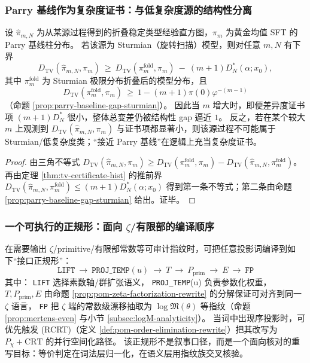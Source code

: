 \subsubsection{Parry 基线作为复杂度证书：与低复杂度源的结构性分离}
\begin{corollary}[折叠直方图 \texorpdfstring{$\Rightarrow$}{=>} 复杂度证书]\label{cor:pom-parry-complexity-detector}
设 \(\hat{\pi}_{m,N}\) 为从某源过程得到的折叠稳定类型经验直方图，\(\pi_m\) 为黄金均值 SFT 的 Parry 基线柱分布。
若该源为 Sturmian（旋转扫描）模型，则对任意 \(m,N\) 有下界
$$
D_{\mathrm{TV}}(\hat{\pi}_{m,N},\pi_m)
\ \ge\
D_{\mathrm{TV}}(\pi_m^{\mathrm{fold}},\pi_m)\ -\ (m+1)D_N^*(\alpha;x_0),
$$
其中 \(\pi_m^{\mathrm{fold}}\) 为 Sturmian 极限分布折叠后的模型分布，且
$$
D_{\mathrm{TV}}(\pi_m^{\mathrm{fold}},\pi_m)\ \ge\ 1-(m+1)\pi(0)\varphi^{-(m-1)}
$$
（命题 \ref{prop:parry-baseline-gap-sturmian}）。
因此当 \(m\) 增大时，即便差异度证书项 \((m+1)D_N^*\) 很小，整体总变差仍被结构性 gap 逼近 \(1\)。
反之，若在某个较大 \(m\) 上观测到 \(D_{\mathrm{TV}}(\hat{\pi}_{m,N},\pi_m)\) 与证书项都显著小，则该源过程不可能属于 Sturmian/低复杂度类；“接近 Parry 基线”在逻辑上充当复杂度证书。
\end{corollary}
\begin{proof}
由三角不等式
\(
D_{\mathrm{TV}}(\hat{\pi}_{m,N},\pi_m)\ge D_{\mathrm{TV}}(\pi_m^{\mathrm{fold}},\pi_m)-D_{\mathrm{TV}}(\hat{\pi}_{m,N},\pi_m^{\mathrm{fold}})
\)。
再由定理 \ref{thm:tv-certificate-hist} 的推前界
\(
D_{\mathrm{TV}}(\hat{\pi}_{m,N},\pi_m^{\mathrm{fold}})\le (m+1)D_N^*(\alpha;x_0)
\)
得到第一条不等式；第二条由命题 \ref{prop:parry-baseline-gap-sturmian} 给出。证毕。
\end{proof}

\subsubsection{一个可执行的正规形：面向 \texorpdfstring{$\zeta$}{zeta}/有限部的编译顺序}
\begin{remark}[\texorpdfstring{$\zeta$}{zeta}-接口正规形（编译约定）]\label{rem:pom-zeta-normal-form}
在需要输出 \(\zeta\)/primitive/有限部常数等可审计指纹时，可把任意投影词编译到如下“接口正规形”：
$$
\boxed{\;
\texttt{LIFT}\ \to\ \texttt{PROJ\_TEMP}(u)\ \to\ T\ \to\ P_{\mathrm{prim}}\ \to\ E\ \to\ \texttt{FP}\;}
$$
其中：
\texttt{LIFT} 选择素数轴/群扩张语义，
\texttt{PROJ\_TEMP}(u) 负责参数化权重，
\(T,P_{\mathrm{prim}},E\) 由命题 \ref{prop:pom-zeta-factorization-rewrite} 的分解保证可对齐到同一 \(\zeta\) 语言，
\texttt{FP} 把 \(\zeta\) 端的常数级漂移抽取为 \(\log\mathfrak{M}(\theta)\) 等指纹（命题 \ref{prop:mertens-even} 与小节 \ref{subsec:logM-analyticity}）。
当词中出现序投影时，可优先触发 (RCRT)（定义 \ref{def:pom-order-elimination-rewrite}）把其改写为 \(P_\chi+\mathrm{CRT}\) 的并行空间化路径。
该正规形不是叙事口径，而是一个面向核对的重写目标：等价判定在词法层归一化，在语义层用指纹族交叉核验。
\end{remark}

